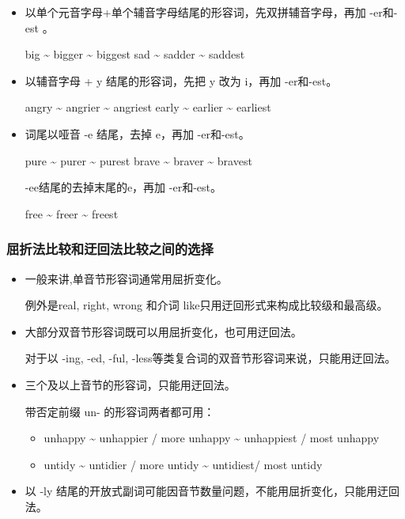 \begin{itemize}
\item 以单个元音字母+单个辅音字母结尾的形容词，先双拼辅音字母，再加 -er和-est 。

  big \~{} bigger \~{} biggest \qquad sad \~{} sadder \~{} saddest

\item 以辅音字母 + y 结尾的形容词，先把 y 改为 i，再加 -er和-est。

  angry \~{} angrier \~{} angriest \qquad early \~{} earlier \~{} earliest

\item 词尾以哑音 -e 结尾，去掉 e，再加 -er和-est。

  pure \~{} purer \~{} purest \qquad brave \~{} braver \~{} bravest

  -ee结尾的去掉末尾的e，再加 -er和-est。

  free \~{} freer \~{} freest

\end{itemize}

\subsubsection{屈折法比较和迂回法比较之间的选择}
\begin{itemize}
\item 一般来讲,单音节形容词通常用屈折变化。

  例外是real, right, wrong 和介词 like只用迂回形式来构成比较级和最高级。

\item 大部分双音节形容词既可以用屈折变化，也可用迂回法。

  对于以 -ing, -ed, -ful, -less等类复合词的双音节形容词来说，只能用迂回法。

\item 三个及以上音节的形容词，只能用迂回法。

  带否定前缀 un- 的形容词两者都可用：
  \begin{itemize}
  \item unhappy \~{} unhappier / more unhappy \~{} unhappiest / most unhappy

  \item untidy \~{} untidier / more untidy \~{} untidiest/ most untidy
  \end{itemize}
\item 以 -ly 结尾的开放式副词可能因音节数量问题，不能用屈折变化，只能用迂回法。
\end{itemize}


